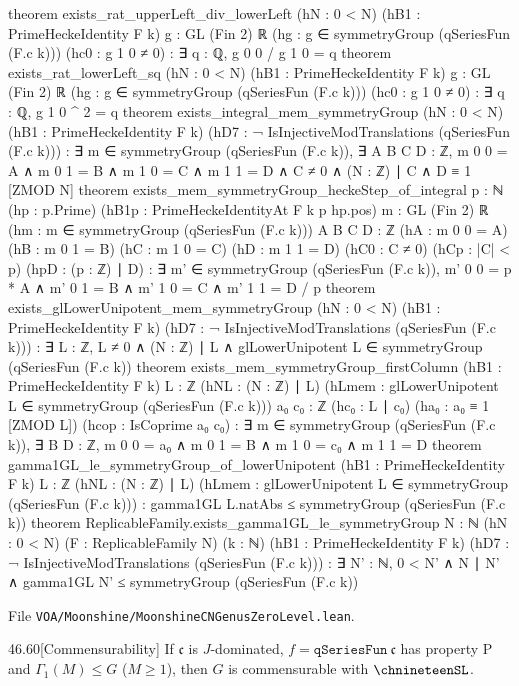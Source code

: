 \documentclass[11pt,openany]{book}
\newcommand{\leanpath}[1]{\texttt{\small #1}}
\theoremstyle{definition}
\theoremstyle{plain}
\begin{document}
\begin{leancode}
theorem exists_rat_upperLeft_div_lowerLeft (hN : 0 < N) (hB1 : PrimeHeckeIdentity F k)
    {g : GL (Fin 2) ℝ} (hg : g ∈ symmetryGroup (qSeriesFun (F.c k))) (hc0 : g 1 0 ≠ 0) :
    ∃ q : ℚ, g 0 0 / g 1 0 = q
theorem exists_rat_lowerLeft_sq (hN : 0 < N) (hB1 : PrimeHeckeIdentity F k)
    {g : GL (Fin 2) ℝ} (hg : g ∈ symmetryGroup (qSeriesFun (F.c k))) (hc0 : g 1 0 ≠ 0) :
    ∃ q : ℚ, g 1 0 ^ 2 = q
theorem exists_integral_mem_symmetryGroup (hN : 0 < N) (hB1 : PrimeHeckeIdentity F k)
    (hD7 : ¬ IsInjectiveModTranslations (qSeriesFun (F.c k))) :
    ∃ m ∈ symmetryGroup (qSeriesFun (F.c k)), ∃ A B C D : ℤ, m 0 0 = A ∧ m 0 1 = B ∧
      m 1 0 = C ∧ m 1 1 = D ∧ C ≠ 0 ∧ (N : ℤ) ∣ C ∧ D ≡ 1 [ZMOD N]
theorem exists_mem_symmetryGroup_heckeStep_of_integral {p : ℕ} (hp : p.Prime)
    (hB1p : PrimeHeckeIdentityAt F k p hp.pos) {m : GL (Fin 2) ℝ}
    (hm : m ∈ symmetryGroup (qSeriesFun (F.c k))) {A B C D : ℤ} (hA : m 0 0 = A)
    (hB : m 0 1 = B) (hC : m 1 0 = C) (hD : m 1 1 = D) (hC0 : C ≠ 0) (hCp : |C| < p)
    (hpD : (p : ℤ) ∣ D) :
    ∃ m' ∈ symmetryGroup (qSeriesFun (F.c k)), m' 0 0 = p * A ∧ m' 0 1 = B ∧ m' 1 0 = C ∧
      m' 1 1 = D / p
theorem exists_glLowerUnipotent_mem_symmetryGroup (hN : 0 < N) (hB1 : PrimeHeckeIdentity F k)
    (hD7 : ¬ IsInjectiveModTranslations (qSeriesFun (F.c k))) :
    ∃ L : ℤ, L ≠ 0 ∧ (N : ℤ) ∣ L ∧ glLowerUnipotent L ∈ symmetryGroup (qSeriesFun (F.c k))
theorem exists_mem_symmetryGroup_firstColumn (hB1 : PrimeHeckeIdentity F k)
    {L : ℤ} (hNL : (N : ℤ) ∣ L)
    (hLmem : glLowerUnipotent L ∈ symmetryGroup (qSeriesFun (F.c k))) {a₀ c₀ : ℤ}
    (hc₀ : L ∣ c₀) (ha₀ : a₀ ≡ 1 [ZMOD L]) (hcop : IsCoprime a₀ c₀) :
    ∃ m ∈ symmetryGroup (qSeriesFun (F.c k)), ∃ B D : ℤ, m 0 0 = a₀ ∧ m 0 1 = B ∧
      m 1 0 = c₀ ∧ m 1 1 = D
theorem gamma1GL_le_symmetryGroup_of_lowerUnipotent (hB1 : PrimeHeckeIdentity F k)
    {L : ℤ} (hNL : (N : ℤ) ∣ L)
    (hLmem : glLowerUnipotent L ∈ symmetryGroup (qSeriesFun (F.c k))) :
    gamma1GL L.natAbs ≤ symmetryGroup (qSeriesFun (F.c k))
theorem ReplicableFamily.exists_gamma1GL_le_symmetryGroup {N : ℕ} (hN : 0 < N)
    (F : ReplicableFamily N) (k : ℕ) (hB1 : PrimeHeckeIdentity F k)
    (hD7 : ¬ IsInjectiveModTranslations (qSeriesFun (F.c k))) :
    ∃ N' : ℕ, 0 < N' ∧ N ∣ N' ∧ gamma1GL N' ≤ symmetryGroup (qSeriesFun (F.c k))
\end{leancode}
\noindent File \leanpath{VOA/\allowbreak Moonshine/\allowbreak MoonshineCNGenusZeroLevel.lean}.
\medskip
\begin{btheorem}{46.60}[Commensurability]
If $\mathfrak c$ is $J$-dominated, $f=\mathtt{qSeriesFun}\ \mathfrak c$ has property P and $\Gamma_1(M)\le G$ ($M\ge1$), then $G$ is commensurable with $\chnineteenSL$.
\end{btheorem}
\end{document}
